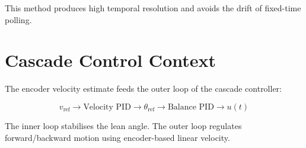 \documentclass[11pt,a4paper]{article}
\begin{document}
This method produces high temporal resolution and avoids the drift of fixed-time polling.

\section{Cascade Control Context}

The encoder velocity estimate feeds the outer loop of the cascade controller:

\[
v_{\text{ref}}
\longrightarrow
\boxed{\text{Velocity PID}}
\longrightarrow
\theta_{\text{ref}}
\longrightarrow
\boxed{\text{Balance PID}}
\longrightarrow
u(t)
\]

The inner loop stabilises the lean angle.  
The outer loop regulates forward/backward motion using encoder-based linear velocity.
\end{document}
